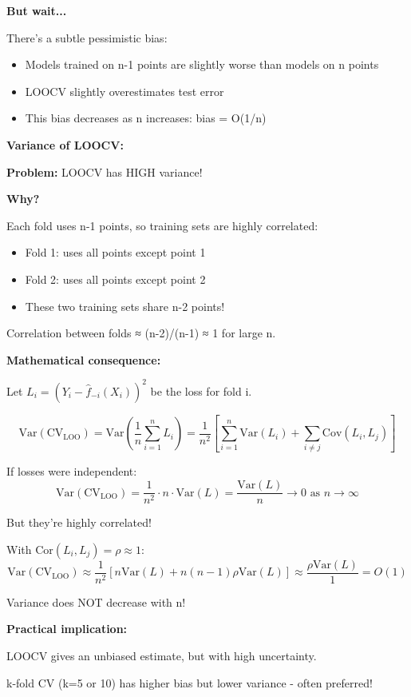 \documentclass[12pt]{article}
\begin{document}
\begin{explanation}
\textbf{But wait...}

There's a subtle pessimistic bias:
\begin{itemize}
    \item Models trained on n-1 points are slightly worse than models on n points
    \item LOOCV slightly overestimates test error
    \item This bias decreases as n increases: bias = O(1/n)
\end{itemize}

\textbf{Variance of LOOCV:}

\textbf{Problem:} LOOCV has HIGH variance!

\textbf{Why?}

Each fold uses n-1 points, so training sets are highly correlated:
\begin{itemize}
    \item Fold 1: uses all points except point 1
    \item Fold 2: uses all points except point 2
    \item These two training sets share n-2 points!
\end{itemize}

Correlation between folds ≈ (n-2)/(n-1) ≈ 1 for large n.

\textbf{Mathematical consequence:}

Let $L_i = (Y_i - \hat{f}_{-i}(X_i))^2$ be the loss for fold i.

\[
\text{Var}(\text{CV}_{\text{LOO}}) = \text{Var}\left(\frac{1}{n}\sum_{i=1}^n L_i\right) = \frac{1}{n^2}\left[\sum_{i=1}^n \text{Var}(L_i) + \sum_{i \neq j}\text{Cov}(L_i, L_j)\right]
\]

If losses were independent:
\[
\text{Var}(\text{CV}_{\text{LOO}}) = \frac{1}{n^2} \cdot n \cdot \text{Var}(L) = \frac{\text{Var}(L)}{n} \to 0 \text{ as } n \to \infty
\]

But they're highly correlated!

With Cor$(L_i, L_j) = \rho \approx 1$:
\[
\text{Var}(\text{CV}_{\text{LOO}}) \approx \frac{1}{n^2}[n\text{Var}(L) + n(n-1)\rho\text{Var}(L)] \approx \frac{\rho\text{Var}(L)}{1} = O(1)
\]

Variance does NOT decrease with n!

\textbf{Practical implication:}

LOOCV gives an unbiased estimate, but with high uncertainty.

k-fold CV (k=5 or 10) has higher bias but lower variance - often preferred!


\end{explanation}
\end{document}
